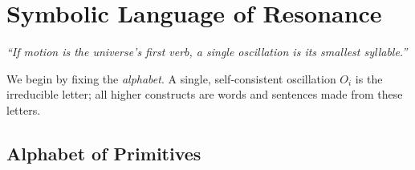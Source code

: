 \chapter{Symbolic Language of Resonance}


\begin{center}
\emph{“If motion is the universe’s first verb, a single oscillation is its smallest syllable.”}
\end{center}

\bigskip
We begin by fixing the \emph{alphabet}. A single, self-consistent oscillation \(O_i\) is the irreducible letter; all higher constructs are words and sentences made from these letters.

\section{Alphabet of Primitives}

